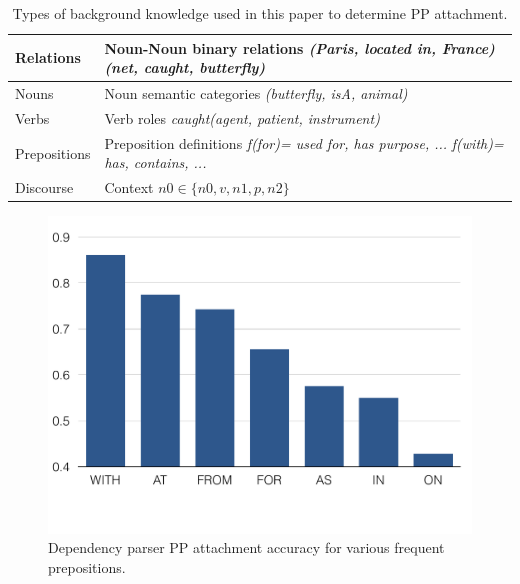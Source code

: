 \begin{table}[h]
\centering
\small{
   \begin{tabular}{|p{1.8cm}|p{4.9cm}|}
     \hline
     Relations &  Noun-Noun binary relations  \newline \textit{ (Paris, located in, France)} \newline \textit{(net, caught, butterfly)}\\
     \hline
     Nouns &  Noun semantic categories \newline \textit{(butterfly, isA, animal)}  \\
     \hline
     Verbs & Verb roles \newline  \textit{caught(agent, patient, instrument)} \\
     \hline
     Prepositions& Preposition  definitions \newline  
     \textit{ f(for)= used for, has purpose, ...}  
     \newline \textit{f(with)= has, contains, ...}  \\
     \hline
     Discourse &  Context \newline  $n0 \in \{n0, v, n1, p, n2\}$\\
     \hline
   \end{tabular}
   \caption{Types of background   
   knowledge used in this paper to determine PP attachment.}
     \label{tab:knowledge}
     }      
   \end{table}   
   

\begin{figure}[t]
%
\centering
%
\includegraphics[width=0.80\columnwidth] {mainresults-0.pdf}
\vspace*{-0.8cm}
\caption{Dependency parser PP attachment accuracy for various frequent prepositions.}
%
\label{fig:parser}
%
\end{figure}  

                